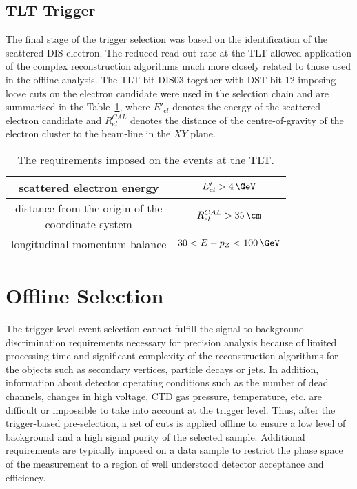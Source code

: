 \subsection{TLT Trigger}
\label{subsec:tltcuts}
The final stage of the trigger selection was based on the identification of the scattered DIS electron. The reduced read-out rate at the TLT allowed application of the complex reconstruction algorithms much more closely related to those used in the offline analysis. The TLT bit \textsf{DIS03} together with DST bit 12 imposing loose cuts on the electron candidate were used in the selection chain and are summarised in the Table~\ref{tab:TLTDSTreq}, where  $E'_{el}$ denotes the energy of the scattered electron candidate and $R_{el}^{CAL}$ denotes the distance of the centre-of-gravity of the electron cluster to the beam-line in the $XY$ plane.
\begin{table}[ht!]
\centering
\begin{tabular}{c|c}
\hline scattered electron energy & $E'_{el}>4\,\GeV$ \\ 
\hline \pbox{6cm}{distance from the origin of the \\ coordinate system}  & $R_{el}^{CAL}>35\,\cm$ \\ 
\hline longitudinal momentum balance & $30<E-p_Z<100\,\GeV$\\
\hline 
\end{tabular} 
\caption{The requirements imposed on the events at the TLT.}
\label{tab:TLTDSTreq}
\end{table}

\section{Offline Selection}
\label{sec:offlineselect}
The trigger-level event selection cannot fulfill the signal-to-background discrimination requirements necessary for precision analysis because of limited processing time and significant complexity of the reconstruction algorithms for the objects such as secondary vertices, particle decays or jets. In addition, information about detector operating conditions such as the number of dead channels, changes in high voltage, CTD gas pressure, temperature, etc. are difficult or impossible to take into account at the trigger level. Thus, after the trigger-based pre-selection, a set of cuts is applied offline to ensure a low level of background and a high signal purity of the selected sample. Additional requirements are typically imposed on a data sample to restrict the phase space of the measurement to a region of well understood detector acceptance and efficiency.


